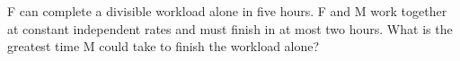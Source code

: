 F can complete a divisible workload alone in five hours. F and M work together at constant independent rates and must finish in at most two hours. What is the greatest time M could take to finish the workload alone?
